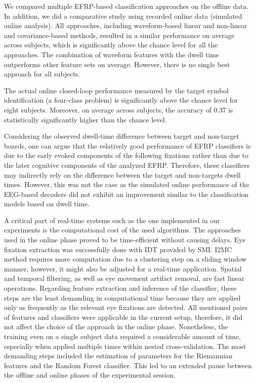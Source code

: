 \documentclass[12pt]{iopart}
\begin{document}
We compared multiple EFRP-based classification approaches on the offline data. In addition, 
we did a comparative study using recorded online data (simulated online analysis).
All approaches, including waveform-based linear and non-linear and covariance-based 
methods, resulted in a similar performance on average across subjects,
which is significantly above the chance level for all the approaches.
The combination of waveform features with the dwell time outperforms
other feature sets on average.
However, there is no single best approach for all subjects.

The actual online closed-loop performance measured by the target symbol identification (a four-class problem)
is significantly above the chance level for eight subjects.
Moreover, on average across subjects, the accuracy of 0.37 is 
statistically significantly higher than the chance level.

Considering the observed dwell-time difference between target and non-target boards, one can argue that the relatively good performance of EFRP classifiers is due to the early evoked components of the following fixations rather than due to the later cognitive components of the analyzed EFRP. Therefore, these classifiers
may indirectly rely on the difference between the target and non-targets dwell times.
However, this was not the case as the simulated online performance of the EEG-based
decoders did not exhibit an improvement similar to the classification models based on
dwell time. 

A critical part of real-time systems such as the one implemented in our
experiments is the computational cost of the used algorithms.
The approaches used in the online phase proved to be time-efficient without
causing delays. Eye fixation extraction was successfully done
with IDT provided by SMI. 
I2MC method requires more computation due to a clustering step 
on a sliding window manner, however, it might also 
be adjusted for a real-time application.
Spatial and temporal filtering, as well as eye movement artifact removal,
are fast linear operations.
Regarding feature extraction and inference of the classifier,
these steps are the least demanding in computational time
because they are applied only as frequently as the relevant
eye fixations are detected. All mentioned pairs of features and classifiers
were applicable in the current setup, therefore,
it did not affect the choice of the approach in the online phase.
Nonetheless, the training even on a single subject data required 
a considerable amount of time, especially when applied multiple
times within nested cross-validation. The most demanding
steps included the estimation of parameters for the Riemannian features
and the Random Forest classifier. This led to an extended
pause between the offline and online phases of the experimental session.
\end{document}
